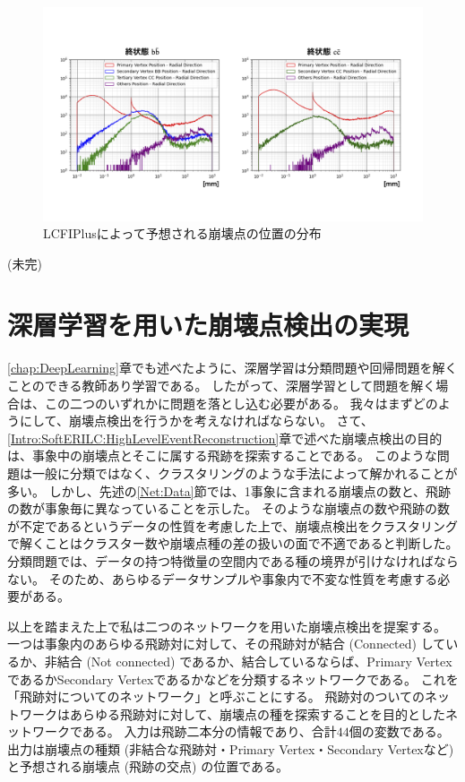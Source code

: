 \begin{figure}[htbp]
 \centering
 \includegraphics[width=1.0\textwidth]{Figure/3Networks/3-1-2-3VertexPositions.png}
 \caption{LCFIPlusによって予想される崩壊点の位置の分布}
 \label{3-1-2-3VertexPositions}
\end{figure}


(未完)

\section{深層学習を用いた崩壊点検出の実現} \label{Net:forVertexFinderwithDL}

\ref{chap:DeepLearning}章でも述べたように、深層学習は分類問題や回帰問題を解くことのできる教師あり学習である。
したがって、深層学習として問題を解く場合は、この二つのいずれかに問題を落とし込む必要がある。
我々はまずどのようにして、崩壊点検出を行うかを考えなければならない。
さて、\ref{Intro:SoftERILC:HighLevelEventReconstruction}章で述べた崩壊点検出の目的は、事象中の崩壊点とそこに属する飛跡を探索することである。
このような問題は一般に分類ではなく、クラスタリングのような手法によって解かれることが多い。
しかし、先述の\ref{Net:Data}節では、1事象に含まれる崩壊点の数と、飛跡の数が事象毎に異なっていることを示した。
そのような崩壊点の数や飛跡の数が不定であるというデータの性質を考慮した上で、崩壊点検出をクラスタリングで解くことはクラスター数や崩壊点種の差の扱いの面で不適であると判断した。
分類問題では、データの持つ特徴量の空間内である種の境界が引けなければならない。
そのため、あらゆるデータサンプルや事象内で不変な性質を考慮する必要がある。

以上を踏まえた上で私は二つのネットワークを用いた崩壊点検出を提案する。
一つは事象内のあらゆる飛跡対に対して、その飛跡対が結合 (Connected) しているか、非結合 (Not connected) であるか、結合しているならば、Primary VertexであるかSecondary Vertexであるかなどを分類するネットワークである。
これを「飛跡対についてのネットワーク」と呼ぶことにする。
飛跡対のついてのネットワークはあらゆる飛跡対に対して、崩壊点の種を探索することを目的としたネットワークである。
入力は飛跡二本分の情報であり、合計$44$個の変数である。
出力は崩壊点の種類 (非結合な飛跡対・Primary Vertex・Secondary Vertexなど) と予想される崩壊点 (飛跡の交点) の位置である。

